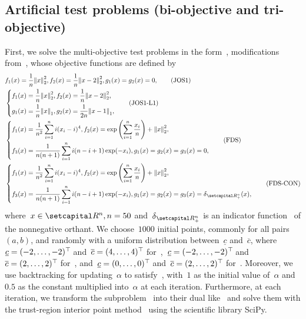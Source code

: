 \documentclass[../main]{subfiles}
\begin{document}
\subsection{Artificial test problems (bi-objective and tri-objective)}
First, we solve the multi-objective test problems in the form~, modifications from~\cite{Jin2001,Fliege2009}, whose objective functions are defined by
\begin{align}
    &f_1(x) = \frac{1}{n} \norm*{x}_2^2,
    f_2(x) = \frac{1}{n} \norm*{x - 2}_2^2,
    g_1(x) = g_2(x) = 0, \tag{JOS1}\label{eq:JOS1} \\
    &\left\{
        \begin{aligned}
            f_1(x) &= \frac{1}{n} \norm*{x}_2^2,
            f_2(x) = \frac{1}{n} \norm*{x - 2}_2^2, \\
            g_1(x) &= \frac{1}{n} \norm*{x}_1,
            g_2(x) = \frac{1}{2n} \norm*{x - 1}_1,
        \end{aligned} \right.
        \label{eq:JOS1_L1} \tag{JOS1-L1}\\
    &\left\{\begin{aligned} 
            f_1(x) &= \frac{1}{n^2} \sum_{i = 1}^{n} i (x_i - i)^4,
            f_2(x) = \exp \left( \sum_{i = 1}^{n} \frac{x_i}{n} \right) + \norm*{x}_2^2,\\
            f_3(x) &= \frac{1}{n (n + 1)} \sum_{i = 1}^{n} i (n - i + 1) \exp (- x_i),
            g_1(x) = g_2(x) = g_3(x) = 0,
    \end{aligned} \right. \label{eq:FDS} \tag{FDS}\\
    &\left\{\begin{aligned} 
            f_1(x) &= \frac{1}{n^2} \sum_{i = 1}^{n} i (x_i - i)^4,
            f_2(x) = \exp \left( \sum_{i = 1}^{n} \frac{x_i}{n} \right) + \norm*{x}_2^2,\\
            f_3(x) &= \frac{1}{n (n + 1)} \sum_{i = 1}^{n} i (n - i + 1) \exp (- x_i),
            g_1(x) = g_2(x) = g_3(x) = \indicator_{\setRpos^n}(x),
    \end{aligned} \right.\label{eq:FDS_CONSTRAINED} \tag{FDS-CON}
\end{align}
where~$x \in \setR^n, n = 50$ and~$\indicator_{\setRpos^n}$ is an indicator function~ of the nonnegative orthant.
We choose~$1000$ initial points, commonly for all pairs~$(a, b)$, and randomly with a uniform distribution between~$\underline{c}$ and~$\overline{c}$, where~$\underline{c} = (-2, \dots, -2)^\top\hspace{-1pt}$ and~$\overline{c} = (4, \dots, 4)^\top\hspace{-1pt}$ for~,~$\underline{c} = (-2, \dots, -2)^\top\hspace{-1pt}$ and~$\overline{c} = (2, \dots, 2)^\top\hspace{-1pt}$ for~, and~$\underline{c} = (0, \dots, 0)^\top\hspace{-1pt}$ and~$\overline{c} = (2, \dots, 2)^\top\hspace{-1pt}$ for~.
Moreover, we use backtracking for updating~$\alpha$ to satisfy~, with~$1$ as the initial value of~$\alpha$ and~$0.5$ as the constant multiplied into~$\alpha$ at each iteration.
Furthermore, at each iteration, we transform the subproblem~ into their dual like~ and solve them with the trust-region interior point method~\cite{Byrd1999} using the scientific library SciPy.
\end{document}
